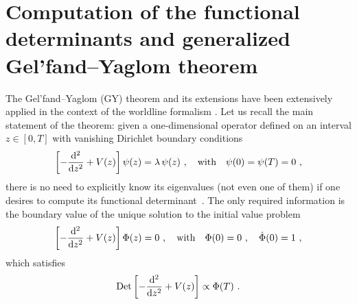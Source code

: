 \documentclass[12pt,a4paper]{article}
\numberwithin{equation}{section}
\numberwithin{equation}{section}
\begin{document}
\section{Computation of the functional determinants and generalized Gel'fand--Yaglom theorem} \label{appB}
The Gel’fand–Yaglom (GY) theorem \cite{Gelfand:1959nq} and its extensions \cite{Kirsten:2003py, Kirsten:2004qv, Kirsten:2005di} have been extensively applied in the context of the worldline formalism \cite{Dunne:2006st, DegliEsposti:2022yqw, DegliEsposti:2024upq}. Let us recall the main statement of the theorem: given a one-dimensional operator defined on an interval $z \in [0,T]$ with vanishing Dirichlet boundary conditions
\begin{equation} \label{Laplace}
\left[ -\frac{{\rm d}^2}{{\rm d} z^2}+V(z) \right] \psi(z)=\lambda \, \psi(z)\ , \quad \text{with} \quad \psi(0)=\psi(T)=0\ ,
\end{equation}
there is no need to explicitly know its eigenvalues (not even one of them) if one desires to compute its functional determinant~\cite{Dunne:2007rt}. The only required information is the boundary value of the unique solution to the initial value problem
\begin{equation}
\left[ -\frac{{\rm d}^2}{{\rm d}z^2}+V(z) \right] \Phi(z)=0\ , \quad \text{with} \quad \Phi(0)=0\ , \quad \dot{\Phi}(0)=1\ ,
\end{equation}
which satisfies
\begin{equation} \label{GY1D}
\mathrm{Det} \left[ -\frac{{\rm d}^2}{{\rm d}z^2}+V(z) \right] \propto \Phi(T)\ .
\end{equation}
\end{document}
